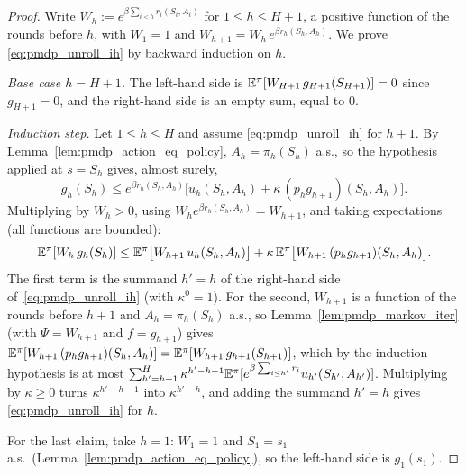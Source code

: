 \begin{proof}
\leanok
Write $W_h := e^{\beta\sum_{i < h} r_i(S_i, A_i)}$ for $1 \le h \le H + 1$, a positive function
of the rounds before $h$, with $W_1 = 1$ and $W_{h+1} = W_h\,e^{\beta r_h(S_h, A_h)}$. We prove
\eqref{eq:pmdp_unroll_ih} by backward induction on $h$.

\emph{Base case $h = H + 1$.} The left-hand side is $\mathbb{E}^\pi[W_{H+1}\,g_{H+1}(S_{H+1})] = 0$
since $g_{H+1} = 0$, and the right-hand side is an empty sum, equal to $0$.

\emph{Induction step.} Let $1 \le h \le H$ and assume \eqref{eq:pmdp_unroll_ih} for $h + 1$.
By Lemma~\ref{lem:pmdp_action_eq_policy}, $A_h = \pi_h(S_h)$ a.s., so the hypothesis applied at
$s = S_h$ gives, almost surely,
\[
  g_h(S_h) \le e^{\beta r_h(S_h, A_h)}\Big[u_h(S_h, A_h) + \kappa\,(p_h g_{h+1})(S_h, A_h)\Big] .
\]
Multiplying by $W_h > 0$, using $W_h e^{\beta r_h(S_h,A_h)} = W_{h+1}$, and taking expectations
(all functions are bounded):
\[
  \mathbb{E}^\pi[W_h\,g_h(S_h)] \le \mathbb{E}^\pi\big[W_{h+1}\,u_h(S_h, A_h)\big]
  + \kappa\,\mathbb{E}^\pi\big[W_{h+1}\,(p_h g_{h+1})(S_h, A_h)\big] .
\]
The first term is the summand $h' = h$ of the right-hand side of~\eqref{eq:pmdp_unroll_ih}
(with $\kappa^0 = 1$). For the second, $W_{h+1}$ is a function of the rounds before $h + 1$
and $A_h = \pi_h(S_h)$ a.s., so Lemma~\ref{lem:pmdp_markov_iter} (with $\Psi = W_{h+1}$ and
$f = g_{h+1}$) gives $\mathbb{E}^\pi[W_{h+1}\,(p_h g_{h+1})(S_h, A_h)] = \mathbb{E}^\pi[W_{h+1}\,g_{h+1}(S_{h+1})]$,
which by the induction hypothesis is at most
$\sum_{h' = h+1}^{H}\kappa^{h' - h - 1}\mathbb{E}^\pi[e^{\beta\sum_{i \le h'} r_i}u_{h'}(S_{h'},A_{h'})]$.
Multiplying by $\kappa \ge 0$ turns $\kappa^{h' - h - 1}$ into $\kappa^{h' - h}$, and adding the
summand $h' = h$ gives \eqref{eq:pmdp_unroll_ih} for $h$.

For the last claim, take $h = 1$: $W_1 = 1$ and $S_1 = s_1$ a.s.\ (Lemma~\ref{lem:pmdp_action_eq_policy}),
so the left-hand side is $g_1(s_1)$.
\end{proof}

